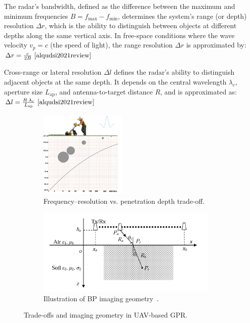 The radar’s bandwidth, defined as the difference between the maximum and minimum frequencies $B = f_{\text{max}} - f_{\text{min}}$, determines the system’s range (or depth) resolution $\Delta r$, which is the ability to distinguish between objects at different depths along the same vertical axis. In free-space conditions where the wave velocity $v_p = c$ (the speed of light), the range resolution $\Delta r$ is approximated by: \(\Delta r = \frac{c}{2B}~\cite{alqudsi2021review}\)

Cross-range or lateral resolution $\Delta l$ defines the radar’s ability to distinguish adjacent objects at the same depth. It depends on the central wavelength $\lambda_c$, aperture size $L_{\text{ap}}$, and antenna-to-target distance $R$, and is approximated as: \(\Delta l = \frac{R \cdot \lambda_c}{L_{\text{ap}}}~\cite{alqudsi2021review}\)

\begin{figure}[h!]
    \centering
    \begin{subfigure}[t]{0.48\linewidth}
        \centering
        \includegraphics[height=4.2cm]{figs/Huirui/freq_tradeoff.png}
        \caption{Frequency–resolution vs. penetration depth trade-off\protect\footnotemark.}
        \label{fig:freq_tradeoff}
    \end{subfigure}
    \hfill
    \begin{subfigure}[t]{0.48\linewidth}
        \centering
        \includegraphics[height=4.2cm]{figs/Huirui/bp_geometry.png}
        \caption{Illustration of BP imaging geometry~\cite{lei2014multi}.}
        \label{fig:bp_geometry}
    \end{subfigure}
    \caption{Trade-offs and imaging geometry in UAV-based GPR.}
\end{figure}

